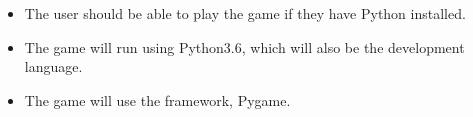\begin{itemize}
    \item The user should be able to play the game if they
    have Python installed.
    \item The game will run using Python3.6, which will also be
    the development language.
    \item The game will use the framework, Pygame.
\end{itemize}
